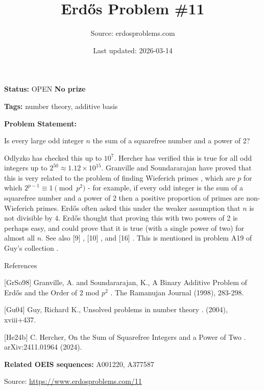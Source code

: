 \documentclass{article}
\title{Erd\H{o}s Problem \#11}
\date{Last updated: 2026-03-14}
\author{Source: erdosproblems.com}
\begin{document}
\maketitle

\noindent\textbf{Status:} OPEN \quad \textbf{No prize}

\noindent\textbf{Tags:} number theory, additive basis

\medskip

\noindent\textbf{Problem Statement:}

Is every large odd integer $n$ the sum of a squarefree number and a power of 2?




Odlyzko has checked this up to $10^7$. Hercher \cite{He24b} has verified this is true for all odd integers up to $2^{50}\approx 1.12\times 10^{15}$. Granville and Soundararajan \cite{GrSo98} have proved that this is very related to the problem of finding Wieferich primes , which are $p$ for which $2^{p-1}\equiv 1\pmod{p^2}$ - for example, if every odd integer is the sum of a squarefree number and a power of $2$ then a positive proportion of primes are non-Wieferich primes. Erd\H{o}s often asked this under the weaker assumption that $n$ is not divisible by $4$. Erd\H{o}s thought that proving this with two powers of 2 is perhaps easy, and could prove that it is true (with a single power of two) for almost all $n$. See also [9] , [10] , and [16] . This is mentioned in problem A19 of Guy's collection \cite{Gu04}.




References

[GrSo98] Granville, A. and Soundararajan, K., A Binary Additive Problem of Erd\H{o}s and the Order of $2$ mod $p^2$ . The Ramanujan Journal (1998), 283-298.

[Gu04] Guy, Richard K., Unsolved problems in number theory . (2004), xviii+437.

[He24b] C. Hercher, On the Sum of Squarefree Integers and a Power of Two . arXiv:2411.01964 (2024).

\noindent\textbf{Related OEIS sequences:} A001220, A377587


\bigskip
\noindent\small{Source: \url{https://www.erdosproblems.com/11}}
\end{document}
